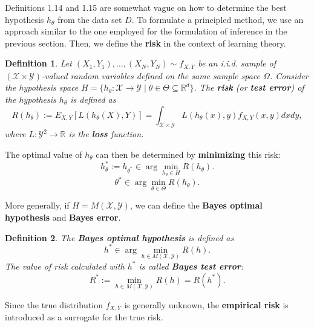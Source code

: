 \documentclass{report}
\newtheorem{definition}{Definition}[chapter]
\begin{document}
Definitions 1.14 and 1.15 are somewhat vague on how to determine the best hypothesis $h_\theta$ from the data set $D$. To formulate a principled method, we use an approach similar to the one employed for the formulation of inference in the previous section. Then, we define the \textbf{risk} in the context of learning theory.

\begin{definition}
Let $(X_1, Y_1),\dots,(X_N, Y_N) \sim f_{X,Y}$ be an i.i.d. sample of $(\mathcal{X} \times \mathcal{Y})$-valued random variables defined on the same sample space $\Omega$. Consider the hypothesis space $H = \{h_\theta : \mathcal{X} \to \mathcal{Y} \mid\theta\in\Theta\subseteq\mathbb{R}^d\}$. The \textbf{risk} (or \textbf{test error}) of the hypothesis $h_\theta$ is defined as
\begin{equation}
R(h_\theta) := E_{X,Y}[L(h_\theta(X),Y)] = \int_{\mathcal{X} \times \mathcal{Y}} L(h_\theta(x),y)f_{X,Y}(x,y)dxdy,
\end{equation}
where $L :\mathcal{Y}^2 \to \mathbb{R}$ is the \textbf{loss} function.
\end{definition}

The optimal value of $h_\theta$ can then be determined by \textbf{minimizing} this risk:
\begin{equation}
h_\theta^* := h_{\theta^*} \in \arg \min_{h_\theta \in H} R(h_\theta).
\end{equation}
\begin{equation}
\theta^* \in \arg \min_{\theta \in \Theta} R(h_\theta).
\end{equation}

More generally, if $H = M(\mathcal{X}, \mathcal{Y})$, we can define the \textbf{Bayes optimal hypothesis} and \textbf{Bayes error}.

\begin{definition}
The \textbf{Bayes optimal hypothesis} is defined as
\begin{equation}
h^*\in \arg \min_{h \in M(\mathcal{X}, \mathcal{Y})} R(h).
\end{equation}
The value of risk calculated with $h^*$ is called \textbf{Bayes test error}:
\begin{equation}
R^* := \min_{h \in M(\mathcal{X}, \mathcal{Y})} R(h) = R(h^*).
\end{equation}
\end{definition}

Since the true distribution $f_{X,Y}$ is generally unknown, the \textbf{empirical risk} is introduced as a surrogate for the true risk.
\end{document}
